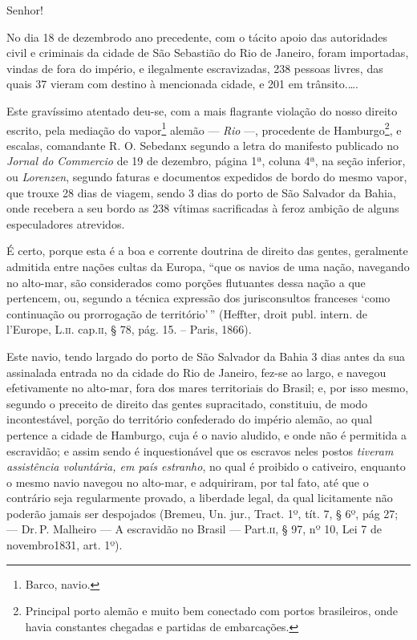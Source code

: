 Senhor!

No dia 18 de dezembrodo ano precedente, com o tácito apoio das
autoridades civil e criminais da cidade de São Sebastião do Rio de
Janeiro, foram importadas, vindas de fora do império, e ilegalmente
escravizadas, 238 pessoas livres, das quais 37 vieram com destino à
mencionada cidade, e 201 em trânsito.\ldots.

Este gravíssimo atentado deu-se, com a mais flagrante violação do nosso
direito escrito, pela mediação do vapor\footnote{ Barco, navio.} alemão
--- \emph{Rio} ---, procedente de Hamburgo\footnote{ Principal porto
  alemão e muito bem conectado com portos brasileiros, onde havia
  constantes chegadas e partidas de embarcações.}, e escalas, comandante
R. O. Sebedanx segundo a letra do manifesto publicado no \emph{Jornal do
Commercio} de 19 de dezembro, página 1ª, coluna 4ª, na seção inferior,
ou \emph{Lorenzen}, segundo faturas e documentos expedidos de bordo do
mesmo vapor, que trouxe 28 dias de viagem, sendo 3 dias do porto de São
Salvador da Bahia, onde recebera a seu bordo as 238 vítimas sacrificadas
à feroz ambição de alguns especuladores atrevidos.

É certo, porque esta é a boa e corrente doutrina de direito das gentes,
geralmente admitida entre nações cultas da Europa, ``que os navios de uma
nação, navegando no alto-mar, são considerados como porções flutuantes
dessa nação a que pertencem, ou, segundo a técnica expressão dos
jurisconsultos franceses `como continuação ou prorrogação de
território'\,'' (Heffter, droit publ. intern. de l'Europe, L.\textsc{ii}. cap.\textsc{ii},
§ 78, pág. 15. -- Paris, 1866).

Este navio, tendo largado do porto de São Salvador da Bahia 3 dias antes
da sua assinalada entrada no da cidade do Rio de Janeiro, fez-se ao
largo, e navegou efetivamente no alto-mar, fora dos mares territoriais
do Brasil; e, por isso mesmo, segundo o preceito de direito das gentes
supracitado, constituiu, de modo incontestável, porção do território
confederado do império alemão, ao qual pertence a cidade de Hamburgo,
cuja é o navio aludido, e onde não é permitida a escravidão; e assim
sendo é inquestionável que os escravos neles postos \emph{tiveram
assistência voluntária, em país estranho}, no qual é proibido o
cativeiro, enquanto o mesmo navio navegou no alto-mar, e adquiriram, por
tal fato, até que o contrário seja regularmente provado, a liberdade
legal, da qual licitamente não poderão jamais ser despojados (Bremeu,
Un. jur., Tract. 1º, tít. 7, § 6º, pág 27; --- Dr.\,P. Malheiro --- A
escravidão no Brasil --- Part.\textsc{ii}, § 97, nº 10, Lei 7 de novembro1831,
art. 1º).

